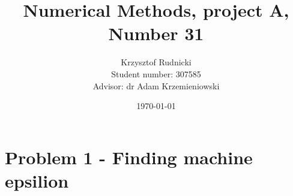 \documentclass[12pt]{report}
\title{Numerical Methods, project A, Number 31}
\author{Krzysztof Rudnicki\\ Student number: 307585 \\ Advisor: dr Adam Krzemieniowski}
\date{\today}
\begin{document}
\maketitle
\tableofcontents

\chapter{Problem 1 - Finding machine epsilion}

	
	
	
	
	
	
	
	
	
	
	
	
	
	
	
	
	
	
	
	
\end{document}
